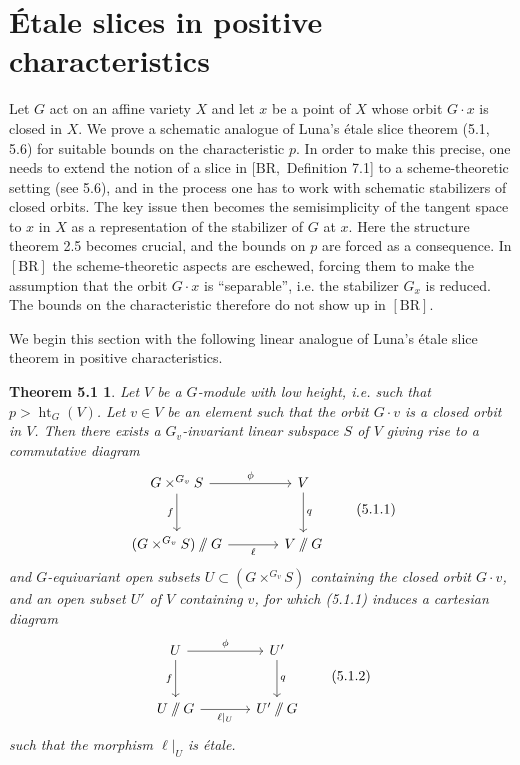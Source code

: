 \documentclass[11pt]{article}
\newcommand{\htG}{\operatorname{ht}_G}
\providecommand{\sslash}{\mathbin{/\mkern-6mu/}}
\newtheorem*{theorem51}{Theorem 5.1}
\begin{document}
\section{Étale slices in positive characteristics}

Let \(G\) act on an affine variety \(X\) and let \(x\) be a point of \(X\) whose orbit
\(G\cdot x\) is closed in \(X\). We prove a schematic analogue of Luna's étale slice
theorem (5.1, 5.6) for suitable bounds on the characteristic \(p\). In order to make
this precise, one needs to extend the notion of a slice in \([\mathrm{BR},\) Definition 7.1]
to a scheme-theoretic setting (see 5.6), and in the process one has to work with
schematic stabilizers of closed orbits. The key issue then becomes the semisimplicity
of the tangent space to \(x\) in \(X\) as a representation of the stabilizer of \(G\) at
\(x\). Here the structure theorem 2.5 becomes crucial, and the bounds on \(p\) are forced
as a consequence. In \([\mathrm{BR}]\) the scheme-theoretic aspects are eschewed, forcing
them to make the assumption that the orbit \(G\cdot x\) is ``separable'', i.e. the
stabilizer \(G_x\) is reduced. The bounds on the characteristic therefore do not show up
in \([\mathrm{BR}]\).

We begin this section with the following linear analogue of Luna's étale slice theorem
in positive characteristics.

\begin{theorem51}
Let \(V\) be a \(G\)-module with low height, i.e. such that \(p>\htG(V)\). Let
\(v\in V\) be an element such that the orbit \(G\cdot v\) is a closed orbit in \(V\).
Then there exists a \(G_v\)-invariant linear subspace \(S\) of \(V\) giving rise to a
commutative diagram
\begin{equation}
\begin{tikzcd}[column sep=large,row sep=large]
  G\times^{G_v}S \arrow[r,"\phi"] \arrow[d,"f"'] & V \arrow[d,"q"] \\
  (G\times^{G_v}S)\sslash G \arrow[r,"\ell"'] & V\sslash G
\end{tikzcd}
\tag{5.1.1}
\end{equation}
and \(G\)-equivariant open subsets \(U\subset (G\times^{G_v}S)\) containing the closed
orbit \(G\cdot v\), and an open subset \(U'\) of \(V\) containing \(v\), for which
(5.1.1) induces a cartesian diagram
\begin{equation}
\begin{tikzcd}[column sep=large,row sep=large]
  U \arrow[r,"\phi"] \arrow[d,"f"'] & U' \arrow[d,"q"] \\
  U\sslash G \arrow[r,"\ell|_{U}"'] & U'\sslash G
\end{tikzcd}
\tag{5.1.2}
\end{equation}
such that the morphism \(\ell|_{U}\) is étale.
\end{theorem51}
\end{document}
